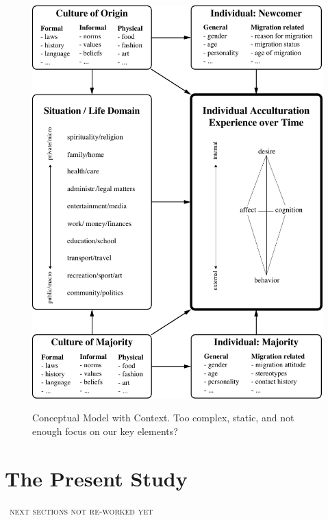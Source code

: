 \documentclass[man, 12pt, a4paper]{apa7}
\newcommand\Warning[1][2ex]{%
  \renewcommand\stacktype{L}%
  \scaleto{\stackon[1.3pt]{\color{red}$\triangle$}{\tiny\bfseries !}}{#1}}%
\begin{document}
\begin{figure}[h]
\centering
\caption{Conceptual Model with Context. Too complex, static, and not enough focus on our key elements?}
\includegraphics[width=\textwidth]{Figures/ConceptualFrameworkStatic.pdf}
\label{fig:ModelContext}
\end{figure}

\section{The Present Study}

\begin{center}
    \Warning\ \textsc{next sections not re-worked yet} \Warning
\end{center}
\end{document}
